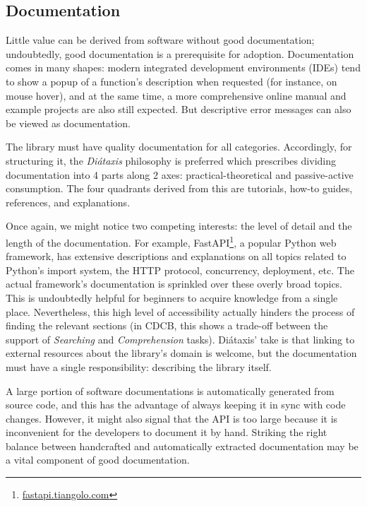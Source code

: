 \subsection{Documentation}

Little value can be derived from software without good documentation; undoubtedly, good documentation is a prerequisite for adoption. Documentation comes in many shapes: modern integrated development environments (IDEs) tend to show a popup of a function's description when requested (for instance, on mouse hover), and at the same time, a more comprehensive online manual and example projects are also still expected. But descriptive error messages can also be viewed as documentation. 

The library must have quality documentation for all categories. Accordingly, for structuring it, the \textit{Diátaxis} philosophy is preferred \cite{Procida_Diataxis_documentation_framework} which prescribes dividing documentation into 4 parts along 2 axes: practical-theoretical and passive-active consumption. The four quadrants derived from this are tutorials, how-to guides, references, and explanations.

Once again, we might notice two competing interests: the level of detail and the length of the documentation. For example, FastAPI\footnote{\href{https://fastapi.tiangolo.com/async/\#concurrent-burgers}{fastapi.tiangolo.com}}, a popular Python web framework, has extensive descriptions and explanations on all topics related to Python's import system, the HTTP protocol, concurrency, deployment, etc. The actual framework's documentation is sprinkled over these overly broad topics. This is undoubtedly helpful for beginners to acquire knowledge from a single place. Nevertheless, this high level of accessibility actually hinders the process of finding the relevant sections (in CDCB, this shows a trade-off between the support of \textit{Searching} and \textit{Comprehension} tasks). Diátaxis' take is that linking to external resources about the library's domain is welcome, but the documentation must have a single responsibility: describing the library itself.

A large portion of software documentations is automatically generated from source code, and this has the advantage of always keeping it in sync with code changes. However, it might also signal that the API is too large because it is inconvenient for the developers to document it by hand. Striking the right balance between handcrafted and automatically extracted documentation may be a vital component of good documentation.


